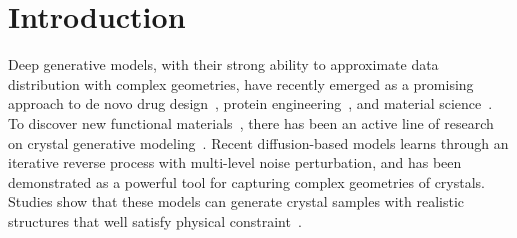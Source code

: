 \section{Introduction}


Deep generative models, with their strong ability to approximate data distribution with complex geometries, have recently emerged as a promising approach to de novo drug design~\citep{hoogeboom2022equivariant}, protein engineering~\citep{shi2022protein}, and material science~\citep{material_dicovery}.  %
To discover new functional materials~\citep{wang2023scientific,peng2022human}, there has been an active line of research on crystal generative modeling~\citep{REN2021,hoffmann2019data,noh2019inverse, court20203,yang2023scalable,nouira2018crystalgan}. Recent diffusion-based models learns through an iterative reverse process with multi-level noise perturbation, and has been demonstrated as a powerful tool for capturing complex geometries of crystals. Studies show that these models can generate crystal samples with realistic structures that well satisfy physical constraint~\citep{xie2021crystal,jiao2023crystal,jiao2024space,equicsp}.


